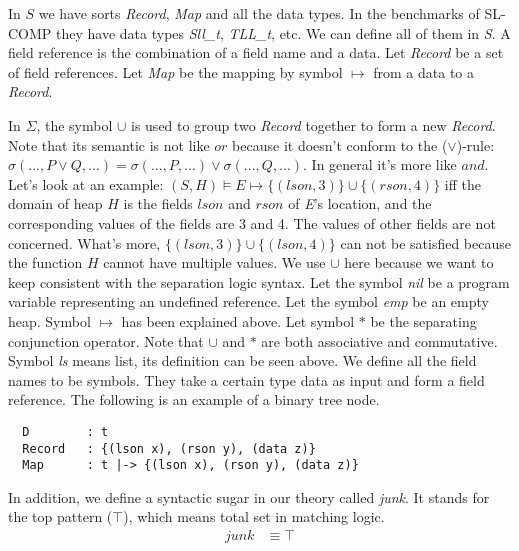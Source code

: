 \documentclass{article}
\theoremstyle{plain}
\begin{document}
In $S$ we have sorts \textit{Record}, \textit{Map} and all the data types. 
In the benchmarks of SL-COMP they have data types \textit{Sll\_t}, \textit{TLL\_t}, etc. 
We can define all of them in \textit{S}. 
A field reference is the combination of a field name and a data. 
Let \textit{Record} be a set of field references. 
Let \textit{Map} be the mapping by symbol $\mapsto$ from a data to a \textit{Record}. 

In $\Sigma$, the symbol $\cup$ is used to group two \textit{Record} together to form a new \textit{Record}. Note that its semantic is not like $or$ because it doesn't conform to the ($\vee$)-rule: $\sigma (...,P\vee Q,...)=\sigma(...,P,...)\vee\sigma(...,Q,...)$. In general it's more like $and$. Let's look at an example: $(S,H) \models E \mapsto \{(lson,3)\}\cup\{(rson,4)\}$ iff the domain of heap $H$ is the fields $lson$ and $rson$ of \textit{E}'s location, and the corresponding values of the fields are 3 and 4. The values of other fields are not concerned. What's more, $\{(lson,3)\}\cup\{(lson,4)\}$ can not be satisfied because the function $H$ cannot have multiple values. We use $\cup$ here because we want to keep consistent with the separation logic syntax. Let the symbol \textit{nil} be a program variable representing an undefined reference. Let the symbol \textit{emp} be an empty heap. Symbol $\mapsto$ has been explained above. Let symbol $*$ be the separating conjunction operator. Note that $\cup$ and $*$ are both associative and commutative. Symbol \textit{ls} means list, its definition can be seen above. We define all the field names to be symbols. They take a certain type data as input and form a field reference. The following is an example of a binary tree node.
\begin{verbatim}
  D        : t
  Record   : {(lson x), (rson y), (data z)}
  Map      : t |-> {(lson x), (rson y), (data z)}   
\end{verbatim}

In addition, we define a syntactic sugar in our theory called  \textit{junk}. It stands for the top pattern ($\top$), which means total set in matching logic. 
\begin{equation*}
\begin{split}
 junk &\equiv \top\\
\end{split}
\end{equation*}
\end{document}
